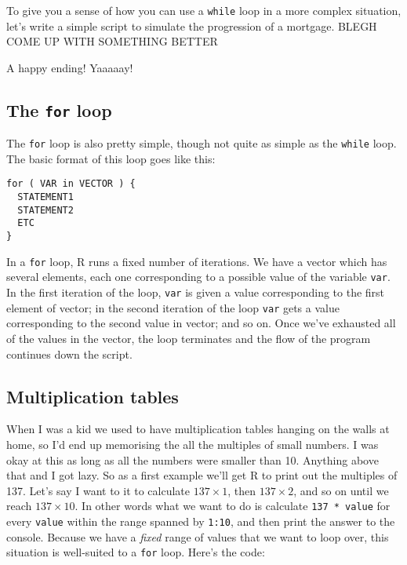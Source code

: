 \documentclass[]{book}
\begin{document}
To give you a sense of how you can use a \texttt{while} loop in a more complex situation, let's write a simple script to simulate the progression of a mortgage. BLEGH COME UP WITH SOMETHING BETTER

A happy ending! Yaaaaay!

\hypertarget{the-for-loop}{%
\subsection{\texorpdfstring{The \texttt{for} loop}{The for loop}}\label{the-for-loop}}

The \texttt{for} loop is also pretty simple, though not quite as simple as the \texttt{while} loop. The basic format of this loop goes like this:

\begin{verbatim}
for ( VAR in VECTOR ) {
  STATEMENT1
  STATEMENT2
  ETC 
}
\end{verbatim}

In a \texttt{for} loop, R runs a fixed number of iterations. We have a vector which has several elements, each one corresponding to a possible value of the variable \texttt{var}. In the first iteration of the loop, \texttt{var} is given a value corresponding to the first element of vector; in the second iteration of the loop \texttt{var} gets a value corresponding to the second value in vector; and so on. Once we've exhausted all of the values in the vector, the loop terminates and the flow of the program continues down the script.

\hypertarget{multiplication-tables}{%
\subsection{Multiplication tables}\label{multiplication-tables}}

When I was a kid we used to have multiplication tables hanging on the walls at home, so I'd end up memorising the all the multiples of small numbers. I was okay at this as long as all the numbers were smaller than 10. Anything above that and I got lazy. So as a first example we'll get R to print out the multiples of 137. Let's say I want to it to calculate \(137 \times 1\), then \(137 \times 2\), and so on until we reach \(137 \times 10\). In other words what we want to do is calculate \texttt{137\ *\ value} for every \texttt{value} within the range spanned by \texttt{1:10}, and then print the answer to the console. Because we have a \emph{fixed} range of values that we want to loop over, this situation is well-suited to a \texttt{for} loop. Here's the code:
\end{document}
